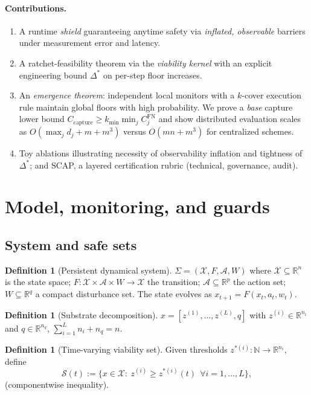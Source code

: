 \documentclass[11pt]{article}
\theoremstyle{definition}
\newtheorem{definition}[theorem]{Definition}
\newcommand{\X}{\mathcal{X}}
\newcommand{\A}{\mathcal{A}}
\newcommand{\Sset}{\mathcal{S}}
\newcommand{\R}{\mathbb{R}}
\begin{document}
\paragraph{Contributions.}
\begin{enumerate}[leftmargin=2em]
\item A runtime \emph{shield} guaranteeing anytime safety via \emph{inflated, observable} barriers under measurement error and latency.
\item A ratchet-feasibility theorem via the \emph{viability kernel} with an explicit engineering bound $\Delta^\ast$ on per-step floor increases.
\item An \emph{emergence theorem}: independent local monitors with a $k$-cover execution rule maintain global floors with high probability. We prove a \emph{base} capture lower bound $C_{\mathrm{capture}} \ge k_{\min}\min_j C^{\mathrm{FN}}_j$ and show distributed evaluation scales as $O(\max_j d_j + m + m^3)$ versus $O(mn + m^3)$ for centralized schemes.
\item Toy ablations illustrating necessity of observability inflation and tightness of $\Delta^\ast$; and SCAP, a layered certification rubric (technical, governance, audit).
\end{enumerate}

\section{Model, monitoring, and guards}
\subsection{System and safe sets}
\begin{definition}[Persistent dynamical system]\label{def:system}
$\Sigma=(\X,F,\A,W)$ where $\X\subseteq\R^n$ is the state space; $F:\X\times \A\times W\to \X$ the transition; $\A\subseteq\R^p$ the action set; $W\subseteq\R^q$ a compact disturbance set. The state evolves as $x_{t+1}=F(x_t,a_t,w_t)$.
\end{definition}

\begin{definition}[Substrate decomposition]\label{def:substrate}
$x=[z^{(1)},\dots,z^{(L)},q]$ with $z^{(i)}\in\R^{n_i}$ and $q\in\R^{n_q}$, $\sum_{i=1}^L n_i+n_q=n$.
\end{definition}

\begin{definition}[Time-varying viability set]\label{def:viability}
Given thresholds $z^{*(i)}:\mathbb N\to\R^{n_i}$, define
\[
\Sset(t):=\{x\in\X:\ z^{(i)}\ge z^{*(i)}(t)\ \ \forall i=1,\dots,L\},
\]
(componentwise inequality).
\end{definition}
\end{document}
